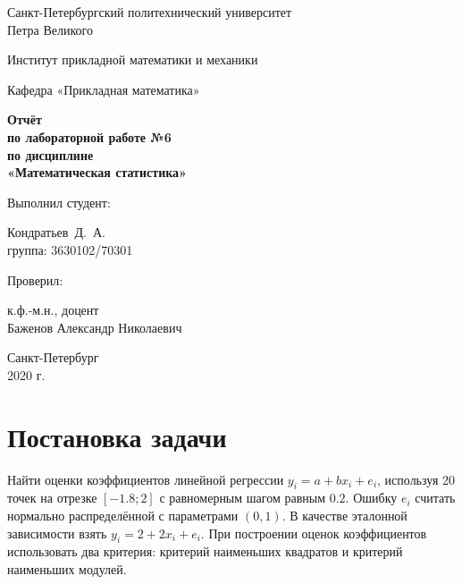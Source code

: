 \documentclass[12pt,a4paper]{article}
\begin{document}
	\begin{titlepage}
		\begin{center}			
			Санкт-Петербургский политехнический университет\\
			Петра Великого
			\vspace{0.25cm}
			
			Институт прикладной математики и механики
			
			Кафедра «Прикладная математика»
			\vfill
			
			\textbf{Отчёт\\
				по лабораторной работе №6\\
				по дисциплине\\
				«Математическая статистика»}\\[5mm]
			\bigskip
		\end{center}
		\vfill
		
		\hfill\begin{minipage}{0.45\textwidth}
			Выполнил студент:
			\vspace{0.2cm}
			
			Кондратьев~Д.~А.\\
			группа: 3630102/70301
		\end{minipage}%
		\bigskip
		
		\hfill\begin{minipage}{0.45\textwidth}
			Проверил:
			\vspace{0.2cm}
			
			к.ф.-м.н., доцент\\
			Баженов Александр Николаевич
		\end{minipage}%
		\vfill
		
		\begin{center}
			Санкт-Петербург\\
			2020 г.
		\end{center}
	\end{titlepage}
	
	
	
	\tableofcontents{}
	\listoffigures
	\listoftables
	
	\newpage
	\section{Постановка задачи}
	
	Найти оценки коэффициентов линейной регрессии $y_i = a + bx_i + e_i$, используя 20 точек на отрезке $[-1.8; 2]$ с равномерным шагом равным $0.2$. Ошибку $e_i$ считать нормально распределённой с параметрами $(0, 1)$. В качестве эталонной зависимости взять $y_i = 2 + 2x_i + e_i$. При построении оценок коэффициентов использовать два критерия: критерий наименьших квадратов и критерий наименьших модулей.
	
\end{document}
